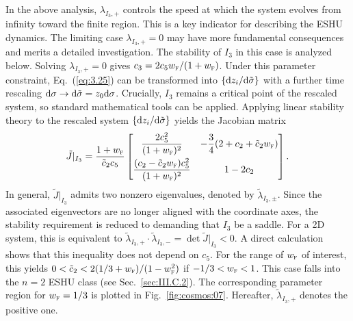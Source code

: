 \documentclass[aps,prd,twocolumn]{revtex4-2}
\newcommand\dx{{\rm d}}
\newcommand\subF{\textsc{f}}
\begin{document}
In the above analysis, $\lambda_{I_3,+}$ controls the speed at which the system evolves from infinity toward the finite region. This is a key indicator for describing the ESHU dynamics. The limiting case $\lambda_{I_3,+}=0$ may have more fundamental consequences and merits a detailed investigation. The stability of $I_3$ in this case is analyzed below. Solving $\lambda_{I_3,+}=0$ gives $c_3=2c_5w_\subF/(1+w_\subF)$. Under this parameter constraint, Eq.~(\ref{eq:3.25}) can be transformed into $\{\dx z_i/\dx\tilde{\sigma}\}$ with a further time rescaling $\dx\sigma\rightarrow\dx\tilde{\sigma}=z_0\dx\sigma$. Crucially, $I_3$ remains a critical point of the rescaled system, so standard mathematical tools can be applied. Applying linear stability theory to the rescaled system $\{\dx z_i/\dx\tilde{\sigma}\}$ yields the Jacobian matrix
\begin{equation}
  \tilde{J}|_{I_3} =
  \frac{1+w_\subF}{\tilde{c}_2 c_5 }
  \begin{bmatrix}
    \displaystyle\frac{2 c_5^2}{(1+w_\subF)^2}  &  -\displaystyle\frac{3}{4} (2+c_2+\tilde{c}_2 w_\subF)  \\[3mm]
    \displaystyle\frac{(c_2-\tilde{c}_2w_\subF) c_5^2}{(1 + w_\subF)^2}  &  1-2c_2
  \end{bmatrix}.
\end{equation}
In general, $\tilde{J}|_{I_3}$ admits two nonzero eigenvalues, denoted by $\tilde{\lambda}_{I_3,\pm}$. Since the associated eigenvectors are no longer aligned with the coordinate axes, the stability requirement is reduced to demanding that $I_3$ be a saddle. For a 2D system, this is equivalent to $\tilde{\lambda}_{I_3,+}\cdot\tilde{\lambda}_{I_3,-}=\det\tilde{J}|_{I_3}<0$. A direct calculation shows that this inequality does not depend on $c_5$. For the range of $w_\subF$ of interest, this yields $0<\tilde{c}_2<2(1/3+w_\subF)/(1-w_\subF^2)$ if $-1/3<w_\subF<1$. This case falls into the $n=2$ ESHU class (see Sec.~\ref{sec:III.C.2}). The corresponding parameter region for $w_\subF=1/3$ is plotted in Fig.~\ref{fig:cosmos:07}. Hereafter, $\tilde{\lambda}_{I_3,+}$ denotes the positive one.
\end{document}
